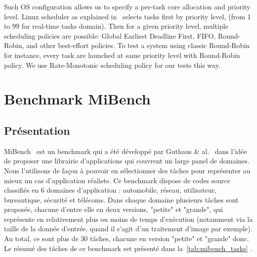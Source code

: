 \documentclass[french, a4paper, 11pt, twoside, pdftex]{StyleThese}
\begin{document}
            
        Such OS configuration allows us to specify a per-task core allocation and priority level. Linux scheduler as explained in~\cite{ishkov_complete_2015} selects tasks first by priority level, (from 1 to 99 for real-time tasks domain). Then for a given priority level, multiple scheduling policies are possible: Global Earliest Deadline First, FIFO, Round-Robin, and other best-effort policies. To test a system using classic Round-Robin for instance, every task are launched at same priority level with Round-Robin policy. We use Rate-Monotonic scheduling policy for our tests this way.
                        
    \section{Benchmark MiBench}
        \subsection{Présentation}
        MiBench~\cite{guthaus_mibench_2001} est un benchmark qui a été développé par Guthaus \& al.~\cite{guthaus_mibench_2001} dans l'idée de proposer une librairie d'applications qui couvrent un large panel de domaines. Nous l'utilisons de façon à pouvoir en sélectionner des tâches pour représenter au mieux un cas d'application réaliste. 
        Ce benchmark dispose de codes source classifiés en 6 domaines d'application : automobile, réseau, utilisateur, bureautique, sécurité et télécoms. Dans chaque domaine plusieurs tâches sont proposée, chacune d'entre elle en deux versions, "petite" et "grande", qui représente en relativement plus ou moins de temps d'exécution (notamment via la taille de la donnée d'entrée, quand il s'agit d'un traitement d'image par exemple). Au total, ce sont plus de 30 tâches, chacune en version "petite" et "grande" donc. Le résumé des tâches de ce benchmark est présenté dans la~\autoref{tab:mibench_tasks} .
        
\end{document}
